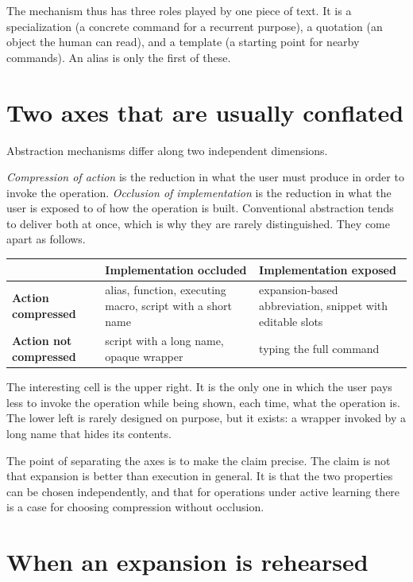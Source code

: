 \documentclass[11pt]{article}
\theoremstyle{remark}
\begin{document}
The mechanism thus has three roles played by one piece of text. It is a specialization (a concrete command for a recurrent purpose), a quotation (an object the human can read), and a template (a starting point for nearby commands). An alias is only the first of these.

\section{Two axes that are usually conflated}

Abstraction mechanisms differ along two independent dimensions.

\emph{Compression of action} is the reduction in what the user must produce in order to invoke the operation. \emph{Occlusion of implementation} is the reduction in what the user is exposed to of how the operation is built. Conventional abstraction tends to deliver both at once, which is why they are rarely distinguished. They come apart as follows.

\begin{center}
\renewcommand{\arraystretch}{1.3}
\begin{tabular}{@{}p{3.3cm}p{5.2cm}p{5.2cm}@{}}
\toprule
 & \textbf{Implementation occluded} & \textbf{Implementation exposed}\\
\midrule
\textbf{Action compressed} & alias, function, executing macro, script with a short name & expansion-based abbreviation, snippet with editable slots\\
\textbf{Action not compressed} & script with a long name, opaque wrapper & typing the full command\\
\bottomrule
\end{tabular}
\end{center}

The interesting cell is the upper right. It is the only one in which the user pays less to invoke the operation while being shown, each time, what the operation is. The lower left is rarely designed on purpose, but it exists: a wrapper invoked by a long name that hides its contents.

The point of separating the axes is to make the claim precise. The claim is not that expansion is better than execution in general. It is that the two properties can be chosen independently, and that for operations under active learning there is a case for choosing compression without occlusion.

\section{When an expansion is rehearsed}
\end{document}
